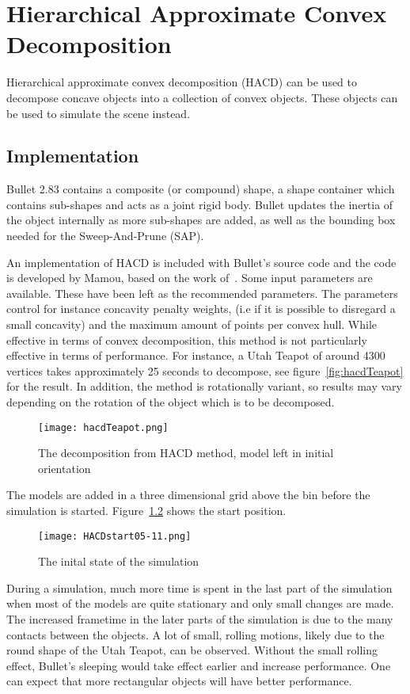 \chapter{Hierarchical Approximate Convex Decomposition}\label{sec:hacd}
Hierarchical approximate convex decomposition (HACD) can be used to decompose
concave objects into a collection of convex objects. These objects can be used
to simulate the scene instead.
\section{Implementation}
Bullet 2.83 contains a
composite (or compound) shape, a shape container which contains sub-shapes and acts
as a joint rigid body. Bullet updates the inertia of the object internally as
more sub-shapes are added, as well as the bounding box needed for the Sweep-And-Prune (SAP).

An implementation of HACD is included with Bullet's source code and the code is
developed by Mamou, based on the work of~\cite{mamou}. Some input parameters are available. These have been
left as the recommended parameters. The parameters control for instance concavity
penalty weights, (i.e if it is possible to disregard a small concavity)
and the maximum amount of points per convex hull.
While effective in terms of convex decomposition, this method is not particularly
effective in terms of performance. For instance, a Utah Teapot of around 4300 vertices
takes approximately 25 seconds to decompose, see figure~\ref{fig:hacdTeapot} for the result. In addition, the method is rotationally
 variant, so results may vary depending on the rotation of the object which is to be decomposed.

 \begin{figure}[H]\label{fig:hacdTeapot}
   \centering
   \texttt{[image: hacdTeapot.png]}
   \caption{The decomposition from HACD method, model left in initial orientation}
   \label{fig:HACD}
 \end{figure}

The models are added in a three dimensional grid above the bin before the simulation
is started. Figure~\ref{fig:hacdStart} shows the start position.

\begin{figure}[H]
  \centering
  \texttt{[image: HACDstart05-11.png]}
  \caption{The inital state of the simulation}
  \label{fig:hacdStart}
\end{figure}

During a simulation, much more time is spent in the last
part of the simulation when most of the models are quite stationary and only small
changes are made. The increased frametime in the later parts of the simulation is
due to the many contacts between the objects. A lot of small, rolling motions, likely due to the round
shape of the Utah Teapot, can be observed. Without the small rolling effect, Bullet's
sleeping would take effect earlier and increase performance. One can expect that
more rectangular objects will have better performance.

